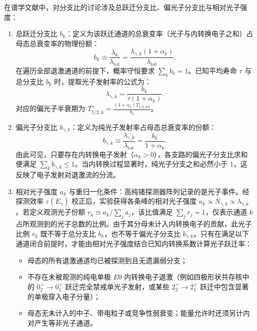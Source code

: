 在谱学文献中，对分支比的讨论涉及总跃迁分支比、偏光子分支比与相对光子强度：
\begin{enumerate}
\item 总跃迁分支比 $b_k$：定义为该跃迁通道的总衰变率（光子与内转换电子之和）占母态总衰变率的物理份额：
\begin{equation}\label{eq:5-9-bk}
b_k \equiv \frac{\lambda_k}{\lambda_{\text{tot}}} = \frac{\lambda_{\gamma, k}(1 + \alpha_k)}{\lambda_{\text{tot}}}.
\end{equation}
在遍历全部退激通道的前提下，概率守恒要求 $\sum_k b_k = 1$。已知平均寿命 $\tau$ 与总分支比 $b_k$ 时，提取光子发射率的公式为：
\begin{equation}\label{eq:5-9-lambda-gamma-k}
\lambda_{\gamma, k} = \frac{b_k}{\tau (1 + \alpha_k)}.
\end{equation}
对应的偏光子半衰期为 $T_{1/2, k}^\gamma = \frac{(1 + \alpha_k) T_{1/2, \text{tot}}}{b_k}$。
\item 偏光子分支比 $b_{\gamma, k}$：定义为纯光子发射率占母态总衰变率的份额：
\begin{equation}\label{eq:5-9-b-gamma-k}
b_{\gamma, k} \equiv \frac{\lambda_{\gamma, k}}{\lambda_{\text{tot}}} = \frac{b_k}{1 + \alpha_k}.
\end{equation}
由此可见，只要存在内转换电子发射（$\alpha_k > 0$），各支路的偏光子分支比求和便满足 $\sum_k b_{\gamma, k} \le 1$。当内转换过程显著时，纯光子分支之和必然小于 1，这反映了电子发射对退激流的分流。
\item 相对光子强度 $a_k$ 与重归一化条件：高纯锗探测器阵列记录的是光子事件。经探测效率 $\varepsilon(E_\gamma)$ 校正后，实验获得各条峰的相对光子强度 $a_k \propto N_{\gamma, k} \propto \lambda_{\gamma, k}$。若定义观测光子份额 $r_k \equiv a_k / \sum_j a_j$，该比值满足 $\sum_j r_j = 1$，仅表示通道 $k$ 占所观测到的光子总数的比例。由于其分母未计入内转换电子的贡献，此光子比例 $r_k$ 既不等于总分支比 $b_k$，也不等于偏光子分支比 $b_{\gamma, k}$。只有在满足以下通道闭合前提时，才能由相对光子强度结合已知内转换系数计算光子跃迁率：
\begin{itemize}
\item 母态的所有退激通道均已被探测到且无遗漏弱分支；
\item 不存在未被观测的纯电单极 $E0$ 内转换电子退激（例如四极形状共存核中的 $0_2^+ \to 0_1^+$ 跃迁完全禁戒单光子发射，或某些 $2_2^+ \to 2_1^+$ 跃迁中包含显著的单极穿入电子分量）；
\item 母态无未计入的中子、带电粒子或竞争性弱衰变；能量允许时还须另计内对产生等非光子通道。
\end{itemize}
\end{enumerate}


